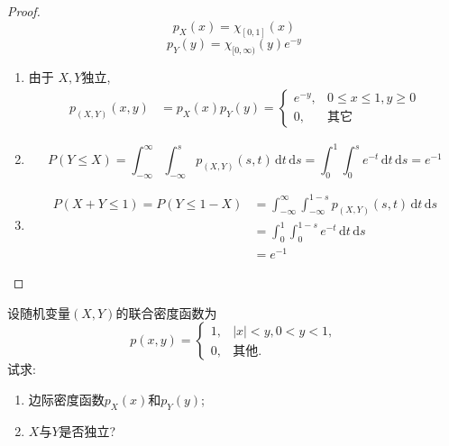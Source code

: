 \documentclass[../main.tex]{subfiles}
\begin{document}
\begin{proof}
     \[
     p_{X}\left( x \right)= \chi _{\left[ 0,1 \right] } \left( x \right)  
     \] \[
     p_{Y}\left( y \right)= \chi _{[0,\infty)}\left(y \right) e^{-y} 
     \]
     \begin{enumerate}
        \item  由于 \(  X,Y  \)独立,  \[
      \begin{aligned}
        p_{\left( X,Y \right) }\left( x,y \right)&= p_{X}\left( x \right)p_{Y}\left( y \right)=   \begin{cases} e^{-y},&0\le x\le 1, y\ge 0\\ 
         0,& \text{其它} \end{cases} 
      \end{aligned}   
        \]
        \item \[
        P\left( Y\le X \right)= \int_{-\infty}^{\infty}\int_{-\infty}^{s}p_{\left( X,Y \right) }\left( s,t \right) \,\mathrm{d} t\,\mathrm{d} s = \int_{0}^{1}\int_{0}^{s}e^{-t}\,\mathrm{d} t\,\mathrm{d} s= e^{-1}
        \]
        \item \[
       \begin{aligned}
        P\left( X+ Y\le 1 \right)= P\left( Y\le 1-X \right)&= \int_{-\infty}^{\infty} \int_{-\infty}^{1-s}p_{\left( X,Y \right) }\left( s,t \right)\,\mathrm{d} t\,\mathrm{d} s\\ 
         &= \int_{0}^{1}\int_{0}^{1-s}e^{-t}\,\mathrm{d} t\,\mathrm{d} s\\ 
          &= e^{-1}
       \end{aligned}   
        \]
     \end{enumerate}
     
\end{proof}
\begin{exercise}{}{}
设随机变量$(X,Y)$的联合密度函数为
\[
p(x,y) = \begin{cases}
1, & |x|<y, 0<y<1, \\
0, & \text{其他}.
\end{cases}
\]
试求:
\begin{enumerate}
    \item 边际密度函数$p_X(x)$和$p_Y(y)$;
    \item $X$与$Y$是否独立?
\end{enumerate}
\end{exercise}
\end{document}
